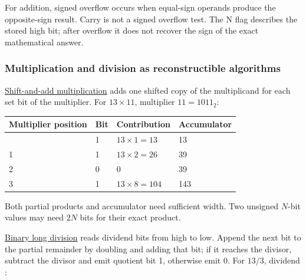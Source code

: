 For addition, signed overflow occurs when equal-sign operands produce the opposite-sign result. Carry is not a signed overflow test. The N flag describes the stored high bit; after overflow it does not recover the sign of the exact mathematical answer.

\subsubsection{Multiplication and division as reconstructible algorithms}\label{01-foundations-i-ch001-multiplication-and-division-as-reconstructible-algorithms}

\hypertarget{01-foundations-i-ch001-multiplication-and-division-as-reconstructible-algorithms}{}

\hyperref[appendix-a65290d66ed9]{Shift-and-add multiplication} adds one shifted copy of the multiplicand for each set bit of the multiplier. For \(13\times11\), multiplier \(11=1011_2\):

{\def\LTcaptype{none} %
\begin{longtable}[]{@{}llll@{}}
\toprule\noalign{}
Multiplier position & Bit & Contribution & Accumulator \\
\midrule\noalign{}
\endhead
\bottomrule\noalign{}
\endlastfoot
0 & 1 & \(13\times1=13\) & 13 \\
1 & 1 & \(13\times2=26\) & 39 \\
2 & 0 & 0 & 39 \\
3 & 1 & \(13\times8=104\) & 143 \\
\end{longtable}
}

Both partial products and accumulator need sufficient width. Two unsigned \(N\)-bit values may need \(2N\) bits for their exact product.

\hyperref[appendix-89985e6a2685]{Binary long division} reads dividend bits from high to low. Append the next bit to the partial remainder by doubling and adding that bit; if it reaches the divisor, subtract the divisor and emit quotient bit 1, otherwise emit 0. For \(13/3\), dividend :

